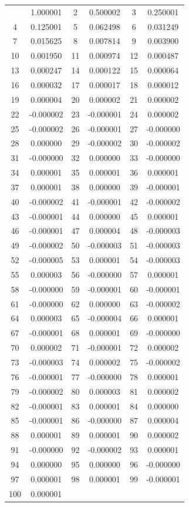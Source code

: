 \documentclass[12pt]{article}
\begin{document}
\begin{longtable}{@{}cc|cc|cc@{}}
\bottomrule
\endlastfoot
1 & 1.000001 & 2 & 0.500002 & 3 & 0.250001 \\
4 & 0.125001 & 5 & 0.062498 & 6 & 0.031249 \\
7 & 0.015625 & 8 & 0.007814 & 9 & 0.003900 \\
10 & 0.001950 & 11 & 0.000974 & 12 & 0.000487 \\
13 & 0.000247 & 14 & 0.000122 & 15 & 0.000064 \\
16 & 0.000032 & 17 & 0.000017 & 18 & 0.000012 \\
19 & 0.000004 & 20 & 0.000002 & 21 & 0.000002 \\
22 & -0.000002 & 23 & -0.000001 & 24 & 0.000002 \\
25 & -0.000002 & 26 & -0.000001 & 27 & -0.000000 \\
28 & 0.000000 & 29 & -0.000002 & 30 & -0.000002 \\
31 & -0.000000 & 32 & 0.000000 & 33 & -0.000000 \\
34 & 0.000001 & 35 & 0.000001 & 36 & 0.000001 \\
37 & 0.000001 & 38 & 0.000000 & 39 & -0.000001 \\
40 & -0.000002 & 41 & -0.000001 & 42 & -0.000002 \\
43 & -0.000001 & 44 & 0.000000 & 45 & 0.000001 \\
46 & -0.000001 & 47 & 0.000004 & 48 & -0.000003 \\
49 & -0.000002 & 50 & -0.000003 & 51 & -0.000003 \\
52 & -0.000005 & 53 & 0.000001 & 54 & -0.000003 \\
55 & 0.000003 & 56 & -0.000000 & 57 & 0.000001 \\
58 & -0.000000 & 59 & -0.000001 & 60 & -0.000001 \\
61 & -0.000000 & 62 & 0.000000 & 63 & -0.000002 \\
64 & 0.000003 & 65 & -0.000004 & 66 & 0.000001 \\
67 & -0.000001 & 68 & 0.000001 & 69 & -0.000000 \\
70 & 0.000002 & 71 & -0.000001 & 72 & 0.000002 \\
73 & -0.000003 & 74 & 0.000002 & 75 & -0.000002 \\
76 & -0.000001 & 77 & -0.000000 & 78 & 0.000001 \\
79 & -0.000002 & 80 & 0.000003 & 81 & 0.000002 \\
82 & -0.000001 & 83 & 0.000001 & 84 & 0.000000 \\
85 & -0.000001 & 86 & -0.000000 & 87 & 0.000004 \\
88 & 0.000001 & 89 & 0.000001 & 90 & 0.000002 \\
91 & -0.000000 & 92 & -0.000002 & 93 & 0.000001 \\
94 & 0.000000 & 95 & 0.000000 & 96 & -0.000000 \\
97 & 0.000001 & 98 & 0.000001 & 99 & -0.000001 \\
100 & 0.000001 &  &  &  &  \\

\end{longtable}
\end{document}
